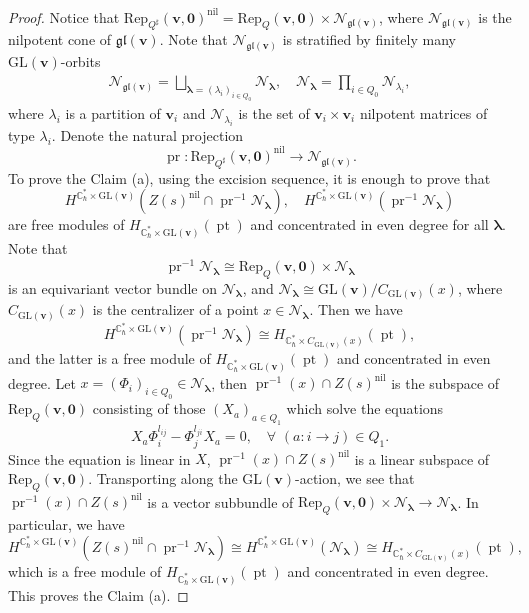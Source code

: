 \documentclass[10pt]{amsart}
\theoremstyle{definition}
\numberwithin{equation}{section}
\newcommand{\GL}{\mathrm{GL}}
\newcommand{\bC}{\mathbb{C}}
\newcommand{\bv}{\mathbf{v}}
\newcommand{\cN}{\mathcal{N}}
\newcommand{\pr}{\operatorname{pr}}
\newcommand{\pt}{\operatorname{pt}}
\begin{document}
\begin{proof}
Notice that $\mathrm{Rep}_{Q^\sharp}(\bv,\mathbf 0)^{\mathrm{nil}}=\mathrm{Rep}_{Q}(\bv,\mathbf 0)\times \cN_{\mathfrak{gl}(\bv)}$, where $\cN_{\mathfrak{gl}(\bv)}$ is the nilpotent cone of $\mathfrak{gl}(\bv)$. Note that $\cN_{\mathfrak{gl}(\bv)}$ is stratified by finitely many $\GL(\bv)$-orbits
\begin{align*}
\cN_{\mathfrak{gl}(\bv)}=\bigsqcup_{\pmb{\lambda}=(\lambda_i)_{i\in Q_0}}\cN_{\pmb{\lambda}},\quad \cN_{\pmb{\lambda}}=\prod_{i\in Q_0}\cN_{\lambda_i},
\end{align*}
where $\lambda_i$ is a partition of $\bv_i$ and $\cN_{\lambda_i}$ is the set of $\bv_i\times \bv_i$ nilpotent matrices of type $\lambda_i$. 
Denote the natural projection 
$$\pr\colon \mathrm{Rep}_{Q^\sharp}(\bv,\mathbf 0)^{\mathrm{nil}}\to \cN_{\mathfrak{gl}(\bv)}. $$
To prove the Claim (a), using the excision sequence, it is enough to prove that 
$$H^{\bC^*_\hbar\times \GL(\bv)}\left(Z(s)^{\mathrm{nil}}\cap \pr^{-1}\cN_{\pmb{\lambda}}\right), \quad 
H^{\bC^*_\hbar\times \GL(\bv)}\left(\pr^{-1}\cN_{\pmb{\lambda}}\right)$$ 
are free modules of $H_{\bC^*_\hbar\times \GL(\bv)}(\pt)$ and concentrated in even degree for all $\pmb{\lambda}$. Note that 
$$\pr^{-1}\cN_{\pmb{\lambda}}\cong \mathrm{Rep}_{Q}(\bv,\mathbf 0)\times \cN_{\pmb{\lambda}}$$ is an equivariant vector bundle on $\cN_{\pmb{\lambda}}$, and $\cN_{\pmb{\lambda}}\cong \GL(\bv)/C_{\GL(\bv)}(x)$, where $C_{\GL(\bv)}(x)$ is the centralizer of a point $x\in \cN_{\pmb{\lambda}}$. Then we have 
$$H^{\bC^*_\hbar\times \GL(\bv)}\left(\pr^{-1}\cN_{\pmb{\lambda}}\right)\cong H_{\bC^*_\hbar\times C_{\GL(\bv)}(x)}(\pt), $$ 
and the latter is a free module of $H_{\bC^*_\hbar\times \GL(\bv)}(\pt)$ and concentrated in even degree. Let $x=(\Phi_i)_{i\in Q_0}\in \cN_{\pmb{\lambda}}$, then $\pr^{-1}(x)\cap Z(s)^{\mathrm{nil}}$ is the subspace of $\mathrm{Rep}_{Q}(\bv,\mathbf 0)$ consisting of those $(X_a)_{a\in Q_1}$ which solve the equations 
$$X_a\Phi_i^{l_{ij}}-\Phi_j^{l_{ji}}X_a=0, \quad \forall \,\,(a:i\to j)\in Q_1. $$ 
Since the equation is linear in $X$, $\pr^{-1}(x)\cap Z(s)^{\mathrm{nil}}$ is a linear subspace of $\mathrm{Rep}_{Q}(\bv,\mathbf 0)$. Transporting along the $\GL(\bv)$-action, we see that $\pr^{-1}(x)\cap Z(s)^{\mathrm{nil}}$ is a vector subbundle of $\mathrm{Rep}_{Q}(\bv,\mathbf 0)\times \cN_{\pmb{\lambda}}\to \cN_{\pmb{\lambda}}$. In particular, we have 
$$H^{\bC^*_\hbar\times \GL(\bv)}\left(Z(s)^{\mathrm{nil}}\cap \pr^{-1}\cN_{\pmb{\lambda}}\right)\cong H^{\bC^*_\hbar\times \GL(\bv)}(\cN_{\pmb{\lambda}})\cong H_{\bC^*_\hbar\times C_{\GL(\bv)}(x)}(\pt), $$ 
which is a free module of $H_{\bC^*_\hbar\times \GL(\bv)}(\pt)$ and concentrated in even degree. This proves the Claim (a). 


\end{proof}
\end{document}
